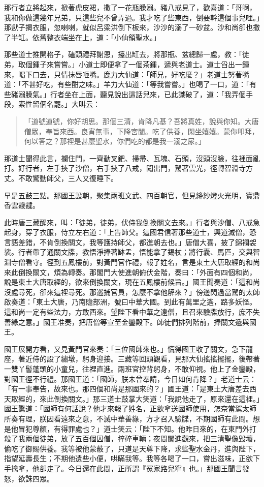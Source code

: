 那行者立將起來，掀著虎皮裙，撒了一花瓶臊溺。豬八戒見了，歡喜道：「哥啊，我和你做這幾年兄弟，只這些兒不曾弄過。我才吃了些東西，倒要幹這個事兒哩。」那獃子揭衣服，忽喇喇，就似呂梁洪倒下板來，沙沙的溺了一砂盆。沙和尚卻也撒了半缸。依舊整衣端坐在上，道：「小仙領聖水。」

那些道士推開格子，磕頭禮拜謝恩，擡出缸去，將那瓶、盆總歸一處，教：「徒弟，取個鍾子來嘗嘗。」小道士即便拿了一個茶鍾，遞與老道士。道士舀出一鍾來，喝下口去，只情抹唇咂嘴。鹿力大仙道：「師兄，好吃麼？」老道士努著嘴道：「不甚好吃，有些酣之味。」羊力大仙道：「等我嘗嘗。」也喝了一口，道：「有些豬溺臊氣。」行者坐在上面，聽見說出這話兒來，已此識破了，道：「我弄個手段，索性留個名罷。」大叫云：
\begin{quote}
「道號道號，你好胡思。那個三清，肯降凡基？吾將真姓，說與你知。大唐僧眾，奉旨來西。良宵無事，下降宮闈。吃了供養，閑坐嬉嬉。蒙你叩拜，何以答之？那裡是甚麼聖水，你們吃的都是我一溺之尿。」
\end{quote}

那道士聞得此言，攔住門，一齊動叉鈀、掃帚、瓦塊、石頭，沒頭沒臉，往裡面亂打。好行者，左手挾了沙僧，右手挾了八戒，闖出門，駕著雲光，徑轉智淵寺方丈。不敢驚動師父，三人又復睡下。

早是五鼓三點。那國王設朝，聚集兩班文武、四百朝官，但見絳紗燈火光明，寶鼎香雲靉靆。

此時唐三藏醒來，叫：「徒弟，徒弟，伏侍我倒換關文去來。」行者與沙僧、八戒急起身，穿了衣服，侍立左右道：「上告師父。這國君信著那些道士，興道滅僧，恐言語差錯，不肯倒換關文，我等護持師父，都進朝去也。」唐僧大喜，披了錦襴袈裟。行者帶了通關文牒，教悟淨捧著缽盂，悟能拿了錫杖；將行囊、馬匹，交與智淵寺僧看守。徑到五鳳樓前，對黃門官作禮，報了姓名，言是東土大唐取經的和尚來此倒換關文，煩為轉奏。那閣門大使進朝俯伏金階，奏曰：「外面有四個和尚，說是東土大唐取經的，欲來倒換關文，現在五鳳樓前候旨。」國王聞奏道：「這和尚沒處尋死，卻來這裡尋死。那巡捕官員，怎麼不拿他解來？」傍邊閃過當駕的太師啟奏道：「東土大唐，乃南贍部洲，號曰中華大國。到此有萬里之遙，路多妖怪。這和尚一定有些法力，方敢西來。望陛下看中華之遠僧，且召來驗牒放行，庶不失善緣之意。」國王准奏，把唐僧等宣至金鑾殿下。師徒們排列階前，捧關文遞與國王。

國王展開方看，又見黃門官來奏：「三位國師來也。」慌得國王收了關文，急下龍座，著近侍的設了繡墩，躬身迎接。三藏等回頭觀看，見那大仙搖搖擺擺，後帶著一雙丫髻蓬頭的小童兒，往裡直進。兩班官控背躬身，不敢仰視。他上了金鑾殿，對國王徑不行禮。那國王道：「國師，朕未曾奉請，今日如何肯降？」老道士云：「有一事奉告，故來也。那四個和尚是那國來的？」國王道：「是東土大唐差去西天取經的，來此倒換關文。」那三道士鼓掌大笑道：「我說他走了，原來還在這裡。」國王驚道：「國師有何話說？他才來報了姓名，正欲拿送國師使用，怎奈當駕太師所奏有理，朕因看遠來之意，不滅中華善緣，方才召入驗牒，不期國師有此問。想是他冒犯尊顏，有得罪處也？」道士笑云：「陛下不知。他昨日來的，在東門外打殺了我兩個徒弟，放了五百個囚僧，捽碎車輛；夜間闖進觀來，把三清聖像毀壞，偷吃了御賜供養。我等被他蒙蔽了，只道是天尊下降，求些聖水金丹，進與陛下，指望延壽長生；不期他遺些小便，哄瞞我等。我等各喝了一口，嘗出滋味，正欲下手擒拿，他卻走了。今日還在此間，正所謂『冤家路兒窄』也。」那國王聞言發怒，欲誅四眾。

